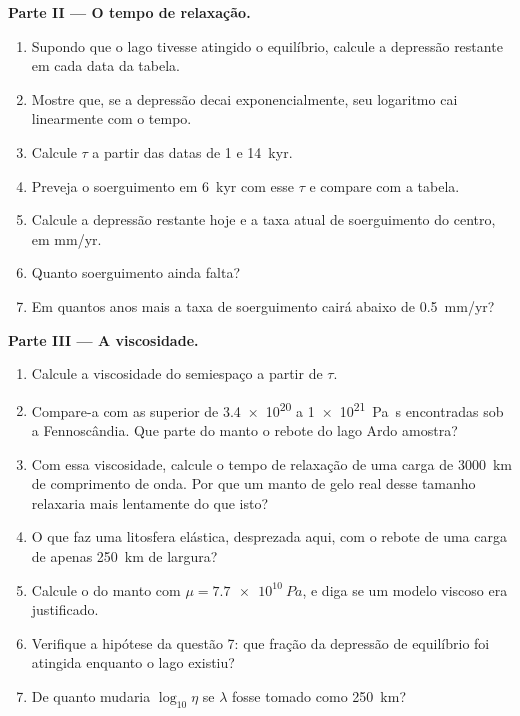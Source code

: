 \begin{problem}
\medskip\noindent\textbf{Parte II --- O tempo de relaxação.}
\begin{enumerate}[resume]
  \item Supondo que o lago tivesse atingido o equilíbrio, calcule a depressão restante
        em cada data da tabela.
  \item Mostre que, se a depressão decai exponencialmente, seu logaritmo cai
        linearmente com o tempo.
  \item Calcule $\tau$ a partir das datas de 1 e \qty{14}{kyr}.
  \item Preveja o soerguimento em \qty{6}{kyr} com esse $\tau$ e compare com a
        tabela.
  \item Calcule a depressão restante hoje e a taxa atual de soerguimento do
        centro, em \unit{mm/yr}.
  \item Quanto soerguimento ainda falta?
  \item Em quantos anos mais a taxa de soerguimento cairá abaixo de
        \qty{0.5}{mm/yr}?
\end{enumerate}

\medskip\noindent\textbf{Parte III --- A viscosidade.}
\begin{enumerate}[resume]
  \item Calcule a viscosidade do semiespaço a partir de $\tau$.
  \item Compare-a com as  superior de \num{3.4e20} a
        \qty{1e21}{Pa.s} encontradas sob a Fennoscândia. Que parte do manto
        o rebote do lago Ardo amostra?
  \item Com essa viscosidade, calcule o tempo de relaxação de uma carga
        de \qty{3000}{km} de comprimento de onda. Por que um manto de gelo real desse
        tamanho relaxaria mais lentamente do que isto?
  \item O que faz uma litosfera elástica, desprezada aqui, com o rebote de uma
        carga de apenas \qty{250}{km} de largura?
  \item Calcule o  do manto com $\mu = \qty{7.7e10}{Pa}$,
        e diga se um modelo viscoso era justificado.
  \item Verifique a hipótese da questão 7: que fração da depressão de equilíbrio
        foi atingida enquanto o lago existiu?
  \item De quanto mudaria $\log_{10}\eta$ se $\lambda$ fosse tomado como
        \qty{250}{km}?
\end{enumerate}


\end{problem}
